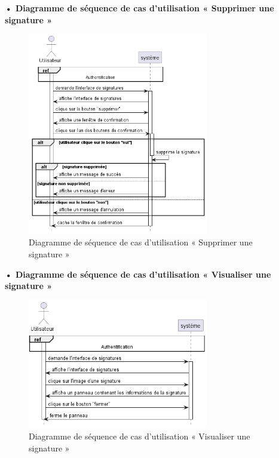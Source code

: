\textbf{•	Diagramme de séquence de cas d'utilisation « Supprimer une signature  »}
\begin{figure}[H]
  \centering
  \includegraphics[width=0.7\textwidth]{out/diagrams/signatures/delete/delete_signature}
  \caption{Diagramme de séquence de cas d'utilisation « Supprimer une signature  »}
  \label{fig:sequence_delete_signature}
\end{figure}

\textbf{•	Diagramme de séquence de cas d'utilisation « Visualiser une signature  »}
\begin{figure}[H]
  \centering
  \includegraphics[width=0.7\textwidth]{out/diagrams/signatures/view/view_signature}
  \caption{Diagramme de séquence de cas d'utilisation « Visualiser une signature  »}
  \label{fig:sequence_view_signature}
\end{figure}

